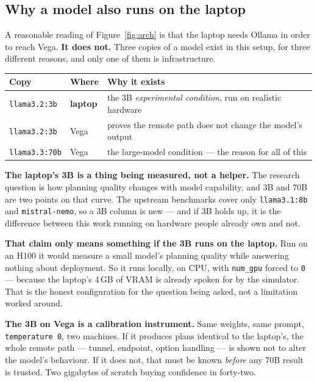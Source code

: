 \documentclass[11pt,a4paper]{article}
\begin{document}
\subsection{Why a model also runs on the laptop}
\label{sec:threecopies}

A reasonable reading of Figure~\ref{fig:arch} is that the laptop needs Ollama in
order to reach Vega. \textbf{It does not.} Three copies of a model exist in this
setup, for three different reasons, and only one of them is infrastructure.

\begin{center}
\begin{tabularx}{\linewidth}{@{}l l X@{}}
\toprule
\textbf{Copy} & \textbf{Where} & \textbf{Why it exists} \\
\midrule
\texttt{llama3.2:3b} & \textbf{laptop} & the 3B \emph{experimental condition},
run on realistic hardware \\
\texttt{llama3.2:3b} & Vega & proves the remote path does not change the model's
output \\
\texttt{llama3.3:70b} & Vega & the large-model condition --- the reason for all
of this \\
\bottomrule
\end{tabularx}
\end{center}

\textbf{The laptop's 3B is a thing being measured, not a helper.} The research
question is how planning quality changes with model capability, and 3B and 70B
are two points on that curve. The upstream benchmarks cover only
\texttt{llama3.1:8b} and \texttt{mistral-nemo}, so a 3B column is new --- and if
3B holds up, it is the difference between this work running on hardware people
already own and not.

\textbf{That claim only means something if the 3B runs on the laptop.} Run on an
H100 it would measure a small model's planning quality while answering nothing
about deployment. So it runs locally, on CPU, with \texttt{num\_gpu} forced to
\texttt{0} --- because the laptop's 4\,GB of VRAM is already spoken for by the
simulator. That is the honest configuration for the question being asked, not a
limitation worked around.

\textbf{The 3B on Vega is a calibration instrument.} Same weights, same prompt,
\texttt{temperature 0}, two machines. If it produces plans identical to the
laptop's, the whole remote path --- tunnel, endpoint, option handling --- is
shown not to alter the model's behaviour. If it does not, that must be known
\emph{before} any 70B result is trusted. Two gigabytes of scratch buying
confidence in forty-two.
\end{document}
